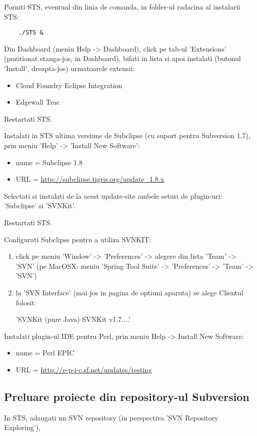 Porniti STS, eventual din linia de comanda, in folder-ul radacina al instalarii STS:
\begin{lstlisting}	
	./STS &
\end{lstlisting}

Din Dashboard (meniu Help -> Dashboard), click pe tab-ul 'Extensions'
(pozitionat stanga-jos, in Dashboard), bifati in lista si apoi instalati
(butonul 'Install', dreapta-jos) urmatoarele extensii:
\begin{itemize}
  \item Cloud Foundry Eclipse Integration
  \item Edgewall Trac
\end{itemize} 

Restartati STS.

Instalati in STS ultima versiune de Subclipse (cu suport pentru Subversion 1.7),
prin meniu 'Help' -> 'Install New Software':
\begin{itemize}
\item 
nume = Subclipse 1.8
\item
URL = \url{http://subclipse.tigris.org/update_1.8.x}
\end{itemize}

Selectati si instalati de la acest update-site ambele seturi de plugin-uri:
'Subclipse' si 'SVNKit'.

Restartati STS.

Configurati Subclipse pentru a utiliza SVNKIT:
\begin{enumerate}
\item 
click pe meniu 'Window' -> 'Preferences' -> alegere din lista 'Team' -> 'SVN'
(pe MacOSX: meniu 'Spring Tool Suite' -> 'Preferences' -> 'Team' -> 'SVN')
\item
la 'SVN Interface' (mai jos in pagina de optiuni aparuta) se alege Clientul
folosit:

'SVNKit (pure Java) SVNKit v1.7....'
\end{enumerate}

Instalati plugin-ul IDE pentru Perl, prin meniu Help -> Install
New Software:
\begin{itemize}
\item 
nume = Perl EPIC
\item
URL = \url{http://e-p-i-c.sf.net/updates/testing}
\end{itemize}

\subsection{Preluare proiecte din repository-ul Subversion}
In STS, adaugati un SVN repository (in perspectiva 'SVN Repository
Exploring'), 

